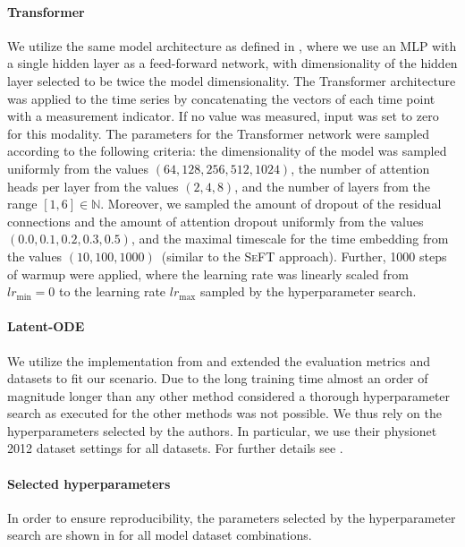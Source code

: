 \documentclass{article}
\renewcommand{\natural}{\mathds{N}\xspace}
\newcommand{\methodname}     {\textsc{SeFT}\xspace}
\begin{document}
\paragraph{Transformer}
We utilize the same model architecture as defined in
\citet{vaswani2017attention}, where we use an MLP with a single hidden
layer as a feed-forward network, with dimensionality of the hidden layer selected to be
twice the model dimensionality. The Transformer architecture was applied to the
time series by concatenating the vectors of each time point with a measurement
indicator. If no value was measured, input was set to zero for this modality.
The parameters for the Transformer network were sampled according to the
following criteria: the dimensionality of the model was sampled uniformly from
the values $(64, 128, 256, 512, 1024)$, the number of attention heads per layer
from the values $(2, 4, 8)$, and the number of layers from the range $[1,6] \in
\natural$. Moreover, we sampled the amount of dropout of the residual
connections and the amount of attention dropout uniformly from the values
$(0.0, 0.1, 0.2, 0.3, 0.5)$, and the maximal timescale for the time embedding
from the values $(10, 100, 1000)$~(similar to the \methodname approach).
Further, 1000 steps of warmup were applied, where the learning rate was
linearly scaled from $lr_{\min} = 0$ to the learning rate $lr_{\max}$ sampled by
the hyperparameter search.

\paragraph{Latent-ODE}
We utilize the implementation from \citet{rubanova2019latent} and extended the
evaluation metrics and datasets to fit our scenario.
Due to the long training time almost an order of magnitude longer than any
other method considered a thorough hyperparameter search as executed for the
other methods was not possible.  We thus rely on the hyperparameters selected
by the authors. In particular, we use their physionet 2012 dataset settings for
all datasets.
For further details see .

\paragraph{Selected hyperparameters}
In order to ensure reproducibility, the parameters selected by the
hyperparameter search are shown in  for
all model dataset combinations.
\end{document}
